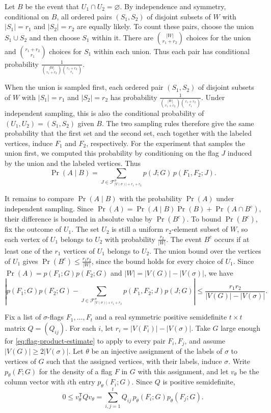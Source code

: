 Let $B$ be the event that $U_1\cap U_2=\varnothing$. By
independence and symmetry, conditional on $B$, all ordered
pairs $(S_1,S_2)$ of disjoint subsets of $W$ with $|S_1|=r_1$
and $|S_2|=r_2$ are equally likely. To count these pairs, choose
the union $S_1\cup S_2$ and then choose $S_1$ within it. There
are $\binom{|W|}{r_1+r_2}$ choices for the union and
$\binom{r_1+r_2}{r_1}$ choices for $S_1$ within each union.
Thus each pair has conditional probability
$\frac{1}{\binom{|W|}{r_1+r_2}\binom{r_1+r_2}{r_1}}$.

When the union is sampled first, each ordered pair $(S_1,S_2)$
of disjoint subsets of $W$ with $|S_1|=r_1$ and $|S_2|=r_2$
has probability
$\frac{1}{\binom{|W|}{r_1+r_2}\binom{r_1+r_2}{r_1}}$.
Under independent sampling, this is also the conditional
probability of $(U_1,U_2)=(S_1,S_2)$ given $B$. The two sampling
rules therefore give the same probability that the first set
and the second set, each together with the labeled vertices,
induce $F_1$ and $F_2$, respectively. For the experiment that
samples the union first, we computed this probability by
conditioning on the flag $J$ induced by the union and the
labeled vertices. Thus
\[
  \Pr(A\mid B)
  =\sum_{J\in\mathcal F^\sigma_{|V(\sigma)|+r_1+r_2}}
    p(J;G)\,p(F_1,F_2;J).
\]

It remains to compare $\Pr(A\mid B)$ with the probability $\Pr(A)$
under independent sampling. Since
$\Pr(A)=\Pr(A\mid B)\Pr(B)+\Pr(A\cap B^c)$, their difference is
bounded in absolute value by $\Pr(B^c)$. To bound $\Pr(B^c)$,
fix the outcome of $U_1$. The set $U_2$ is still a uniform
$r_2$-element subset of $W$, so each vertex of $U_1$ belongs
to $U_2$ with probability $\frac{r_2}{|W|}$. The event $B^c$
occurs if at least one of the $r_1$ vertices of $U_1$ belongs
to $U_2$. The union bound over the vertices of $U_1$ gives
$\Pr(B^c)\leq\frac{r_1r_2}{|W|}$, since the bound holds for every
choice of $U_1$. Since $\Pr(A)=p(F_1;G)p(F_2;G)$ and
$|W|=|V(G)|-|V(\sigma)|$, we have
\begin{equation}\label{eq:flag-product-estimate}
  \left|
    p(F_1;G)p(F_2;G)
    -\sum_{J\in\mathcal F^\sigma_{|V(\sigma)|+r_1+r_2}}
        p(F_1,F_2;J)p(J;G)
  \right|
  \leq \frac{r_1r_2}{|V(G)|-|V(\sigma)|}.
\end{equation}

Fix a list of $\sigma$-flags $F_1,\ldots,F_t$ and a real
symmetric positive semidefinite $t\times t$ matrix $Q=(Q_{ij})$.
For each $i$, let $r_i=|V(F_i)|-|V(\sigma)|$. Take $G$ large
enough for \eqref{eq:flag-product-estimate} to apply to every
pair $F_i,F_j$, and assume $|V(G)|\geq 2|V(\sigma)|$. Let
$\theta$ be an injective assignment of the labels of $\sigma$
to vertices of $G$ such that the assigned vertices, with
their labels, induce $\sigma$. Write $p_\theta(F;G)$ for
the density of a flag $F$ in $G$ with this assignment, and
let $v_\theta$ be the column vector with $i$th entry
$p_\theta(F_i;G)$. Since $Q$ is positive semidefinite,
\[
  0\leq v_\theta^{\mathsf T}Qv_\theta
    =\sum_{i,j=1}^{t}Q_{ij}\,
       p_\theta(F_i;G)p_\theta(F_j;G).
\]

